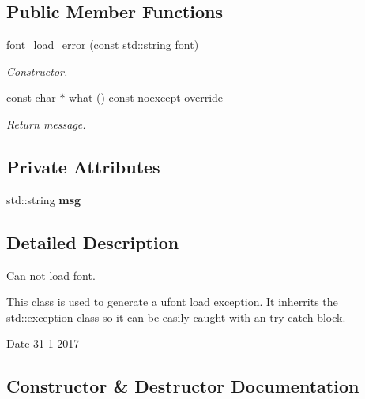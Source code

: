 \subsection*{Public Member Functions}
\begin{DoxyCompactItemize}
\item 
\hyperlink{classfont__load__error_ae7d125fc4bd751d97556cb343a6c6fc4}{font\+\_\+load\+\_\+error} (const std\+::string font)
\begin{DoxyCompactList}\small\item\em Constructor. \end{DoxyCompactList}\item 
const char $\ast$ \hyperlink{classfont__load__error_a17c3014c5953ab5863585e4cbf8865c3}{what} () const noexcept override
\begin{DoxyCompactList}\small\item\em Return message. \end{DoxyCompactList}\end{DoxyCompactItemize}
\subsection*{Private Attributes}
\begin{DoxyCompactItemize}
\item 
\mbox{\label{classfont__load__error_a7e5ccc82a1685b59ac6ecaadbc956397}} 
std\+::string {\bfseries msg}
\end{DoxyCompactItemize}


\subsection{Detailed Description}
Can not load font. 

This class is used to generate a ufont load exception. It inherrits the std\+::exception class so it can be easily caught with an try catch block.

\begin{DoxyDate}{Date}
31-\/1-\/2017 
\end{DoxyDate}


\subsection{Constructor \& Destructor Documentation}
\mbox{\label{classfont__load__error_ae7d125fc4bd751d97556cb343a6c6fc4}} 
